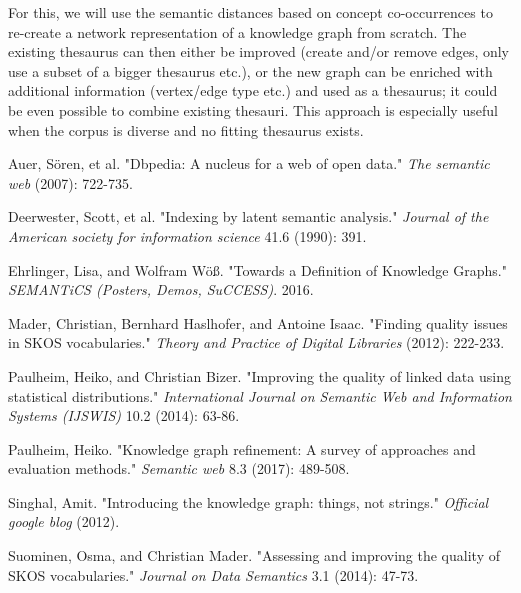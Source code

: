 \documentclass[runningheads,a4paper]{llncs}
\begin{document}
For this, we will use the semantic distances based on concept co-occurrences to re-create a network representation of a knowledge graph from scratch. The existing thesaurus can then either be improved (create and/or remove edges, only use a subset of a bigger thesaurus etc.), or the new graph can be enriched with additional information (vertex/edge type etc.) and used as a thesaurus; it could be even possible to combine existing thesauri. This approach is especially useful when the corpus is diverse and no fitting thesaurus exists.

\begin{thebibliography}{4}


Auer, Sören, et al. "Dbpedia: A nucleus for a web of open data." {\em The semantic web} (2007): 722-735.

Deerwester, Scott, et al. "Indexing by latent semantic analysis." {\em Journal of the American society for information science} 41.6 (1990): 391.

Ehrlinger, Lisa, and Wolfram Wöß. "Towards a Definition of Knowledge Graphs." {\em SEMANTiCS (Posters, Demos, SuCCESS)}. 2016.

Mader, Christian, Bernhard Haslhofer, and Antoine Isaac. "Finding quality issues in SKOS vocabularies." {\em Theory and Practice of Digital Libraries} (2012): 222-233. 

Paulheim, Heiko, and Christian Bizer. "Improving the quality of linked data using statistical distributions." {\em International Journal on Semantic Web and Information Systems (IJSWIS)} 10.2 (2014): 63-86. 

Paulheim, Heiko. "Knowledge graph refinement: A survey of approaches and evaluation methods." {\em Semantic web} 8.3 (2017): 489-508. 

Singhal, Amit. "Introducing the knowledge graph: things, not strings." {\em Official google blog} (2012).

Suominen, Osma, and Christian Mader. "Assessing and improving the quality of SKOS vocabularies." {\em Journal on Data Semantics} 3.1 (2014): 47-73.

\end{thebibliography}
\end{document}
